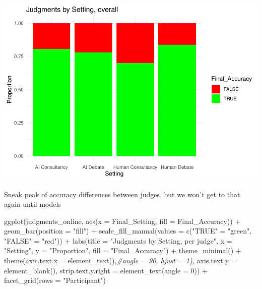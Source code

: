 \documentclass[
]{article}
\newenvironment{Shaded}{\begin{snugshade}}{\end{snugshade}}
\newcommand{\AttributeTok}[1]{\textcolor[rgb]{0.77,0.63,0.00}{#1}}
\newcommand{\CommentTok}[1]{\textcolor[rgb]{0.56,0.35,0.01}{\textit{#1}}}
\newcommand{\DecValTok}[1]{\textcolor[rgb]{0.00,0.00,0.81}{#1}}
\newcommand{\FunctionTok}[1]{\textcolor[rgb]{0.00,0.00,0.00}{#1}}
\newcommand{\NormalTok}[1]{#1}
\newcommand{\OtherTok}[1]{\textcolor[rgb]{0.56,0.35,0.01}{#1}}
\newcommand{\SpecialCharTok}[1]{\textcolor[rgb]{0.00,0.00,0.00}{#1}}
\newcommand{\StringTok}[1]{\textcolor[rgb]{0.31,0.60,0.02}{#1}}
\begin{document}
\includegraphics[width=1\linewidth]{debate-2309_files/figure-latex/quick ori acc stats-1}

Sneak peak of accuracy differences between judges, but we won't get to
that again until models

\begin{Shaded}
\begin{Highlighting}[]
\FunctionTok{ggplot}\NormalTok{(judgments\_online, }\FunctionTok{aes}\NormalTok{(}\AttributeTok{x =}\NormalTok{ Final\_Setting, }\AttributeTok{fill =}\NormalTok{ Final\_Accuracy)) }\SpecialCharTok{+}
  \FunctionTok{geom\_bar}\NormalTok{(}\AttributeTok{position =} \StringTok{"fill"}\NormalTok{) }\SpecialCharTok{+}
  \FunctionTok{scale\_fill\_manual}\NormalTok{(}\AttributeTok{values =} \FunctionTok{c}\NormalTok{(}\StringTok{"TRUE"} \OtherTok{=} \StringTok{"green"}\NormalTok{, }\StringTok{"FALSE"} \OtherTok{=} \StringTok{"red"}\NormalTok{)) }\SpecialCharTok{+}
  \FunctionTok{labs}\NormalTok{(}\AttributeTok{title =} \StringTok{"Judgments by Setting, per judge"}\NormalTok{, }\AttributeTok{x =} \StringTok{"Setting"}\NormalTok{, }\AttributeTok{y =} \StringTok{"Proportion"}\NormalTok{, }\AttributeTok{fill =} \StringTok{"Final\_Accuracy"}\NormalTok{) }\SpecialCharTok{+}
  \FunctionTok{theme\_minimal}\NormalTok{() }\SpecialCharTok{+}
  \FunctionTok{theme}\NormalTok{(}\AttributeTok{axis.text.x =} \FunctionTok{element\_text}\NormalTok{(),}\CommentTok{\#angle = 90, hjust = 1),}
        \AttributeTok{axis.text.y =} \FunctionTok{element\_blank}\NormalTok{(),}
        \AttributeTok{strip.text.y.right =} \FunctionTok{element\_text}\NormalTok{(}\AttributeTok{angle =} \DecValTok{0}\NormalTok{)) }\SpecialCharTok{+}
  \FunctionTok{facet\_grid}\NormalTok{(}\AttributeTok{rows =} \StringTok{"Participant"}\NormalTok{)}
\end{Highlighting}
\end{Shaded}
\end{document}
